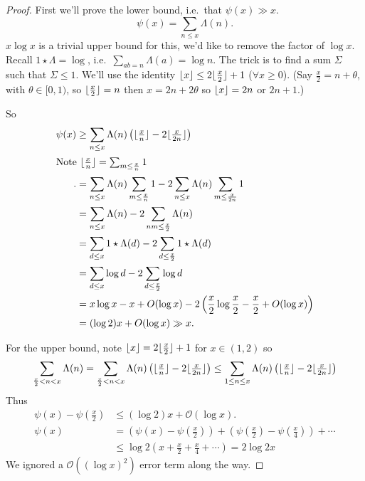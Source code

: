 \documentclass{article}
\newcommand{\bigO}{\mathcal{O}}
\DeclarePairedDelimiter\floor{\lfloor}{\rfloor}
\begin{document}
\begin{proof}
  First we'll prove the lower bound, i.e.\ that $\psi(x) \gg x$.
  \begin{equation*}
    \psi(x) = \sum_{n \leq x} \Lambda(n).
  \end{equation*}
  $x \log x$ is a trivial upper bound for this, we'd like to remove the factor of $\log x$.
  Recall $1 \star \Lambda = \log$, i.e.\ $\sum_{ab=n} \Lambda(a) = \log n$.
  The trick is to find a sum $\Sigma$ such that $\Sigma \leq 1$. We'll use the identity $\floor{x} \leq 2 \floor{\frac{x}{2}} + 1$ ($\forall x \geq 0$).
  (Say $\frac{x}{2} = n + \theta$, with $\theta \in [0,1)$, so $\floor{\frac{x}{2}} = n$ then $x = 2n + 2\theta$ so $\floor{x} = 2n$ or $2n+1$.)

  So
  \begin{align*}
    \psi(x) &\geq \sum_{n \leq x} \Lambda(n) \left(\floor{\tfrac{x}{n}} - 2 \floor{\tfrac{x}{2n}}\right) \\
    \shortintertext{Note $\floor{\frac{x}{n}} = \sum_{m \leq \frac{x}{n}} 1$}.
            &= \sum_{n \leq x} \Lambda(n) \sum_{m \leq \frac xn} 1 - 2 \sum_{n \leq x} \Lambda(n) \sum_{m \leq \frac x {2n}} 1 \\
            &= \sum_{n \leq x} \Lambda(n) - 2 \sum_{nm \leq \frac x2} \Lambda(n) \\
            &= \sum_{d \leq x} 1 \star \Lambda(d) - 2 \sum_{d \leq \frac x2} 1 \star \Lambda(d) \\
            &= \sum_{d \leq x} \log d - 2 \sum_{d \leq \frac{x}{2}} \log d \\
            &= x \log x - x + O(\log x) - 2 \left(\frac{x}{2} \log \frac{x}{2} - \frac{x}{2} + O(\log x)\right) \\
            &= (\log 2) x + O(\log x) \gg x.
  \end{align*}

  For the upper bound, note $\floor{x} = 2 \floor{\frac{x}{2}} + 1$ for $x \in (1,2)$ so
  \begin{equation*}
    \sum_{\frac{x}{2} < n < x} \Lambda(n) = \sum_{\frac{x}{2} < n < x} \Lambda(n) \left(\floor{\tfrac{x}{n}} - 2 \floor{\tfrac{x}{2n}}\right) \leq \sum_{1 \leq n \leq x} \Lambda(n) \left(\floor{\tfrac{x}{n}} - 2 \floor{\tfrac{x}{2n}}\right)
  \end{equation*}
  Thus
  \begin{align*}
    \psi(x) - \psi\left(\frac{x}{2}\right) &\leq (\log 2) x + \bigO(\log x). \\
    \psi(x) &= \left(\psi(x) - \psi\left(\frac{x}{2}\right)\right) + \left(\psi(\frac{x}{2}) - \psi(\frac{x}{4})\right) + \dotsb  \\
    &\leq \log 2\left(x + \frac{x}{2} + \frac{x}{4} + \dotsb\right) = 2 \log 2 x
  \end{align*}
  We ignored a $\bigO((\log x)^2)$ error term along the way.
\end{proof}
\end{document}

